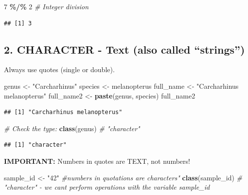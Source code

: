 \documentclass[
]{article}
\newenvironment{Shaded}{\begin{snugshade}}{\end{snugshade}}
\newcommand{\CommentTok}[1]{\textcolor[rgb]{0.56,0.35,0.01}{\textit{#1}}}
\newcommand{\DecValTok}[1]{\textcolor[rgb]{0.00,0.00,0.81}{#1}}
\newcommand{\FunctionTok}[1]{\textcolor[rgb]{0.13,0.29,0.53}{\textbf{#1}}}
\newcommand{\NormalTok}[1]{#1}
\newcommand{\OtherTok}[1]{\textcolor[rgb]{0.56,0.35,0.01}{#1}}
\newcommand{\SpecialCharTok}[1]{\textcolor[rgb]{0.81,0.36,0.00}{\textbf{#1}}}
\newcommand{\StringTok}[1]{\textcolor[rgb]{0.31,0.60,0.02}{#1}}
\begin{document}
\begin{Shaded}
\begin{Highlighting}[]
\DecValTok{7} \SpecialCharTok{\%/\%} \DecValTok{2} \CommentTok{\# Integer division}
\end{Highlighting}
\end{Shaded}

\begin{verbatim}
## [1] 3
\end{verbatim}

\subsection{2. CHARACTER - Text (also called
``strings'')}\label{character---text-also-called-strings}

Always use quotes (single or double).

\begin{Shaded}
\begin{Highlighting}[]
\NormalTok{genus }\OtherTok{\textless{}{-}} \StringTok{"Carcharhinus"}
\NormalTok{species }\OtherTok{\textless{}{-}} \StringTok{\textquotesingle{}melanopterus\textquotesingle{}}
\NormalTok{full\_name }\OtherTok{\textless{}{-}} \StringTok{"Carcharhinus melanopterus"}
\NormalTok{full\_name2 }\OtherTok{\textless{}{-}} \FunctionTok{paste}\NormalTok{(genus, species)}
\NormalTok{full\_name2}
\end{Highlighting}
\end{Shaded}

\begin{verbatim}
## [1] "Carcharhinus melanopterus"
\end{verbatim}

\begin{Shaded}
\begin{Highlighting}[]
\CommentTok{\# Check the type:}
\FunctionTok{class}\NormalTok{(genus)  }\CommentTok{\# "character"}
\end{Highlighting}
\end{Shaded}

\begin{verbatim}
## [1] "character"
\end{verbatim}

\textbf{IMPORTANT:} Numbers in quotes are TEXT, not numbers!

\begin{Shaded}
\begin{Highlighting}[]
\NormalTok{sample\_id }\OtherTok{\textless{}{-}} \StringTok{"42"} \CommentTok{\#numbers in quotations are characters"}
\FunctionTok{class}\NormalTok{(sample\_id)  }\CommentTok{\# "character" {-} we can\textquotesingle{}t perform operations with the variable sample\_id}
\end{Highlighting}
\end{Shaded}
\end{document}
